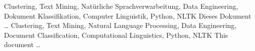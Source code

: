\HAWAbstractPage
  {Clustering, Text Mining, Natürliche Sprachverwarbeitung, Data Engineering, Dokument Klassifikation, Computer Linguistik, Python, NLTK}
  {Dieses Dokument \ldots}
  {Clustering, Text Mining, Natural Language Processing, Data Engineering, Document Classification, Computational Linguistics, Python, NLTK}
  {This document \ldots}